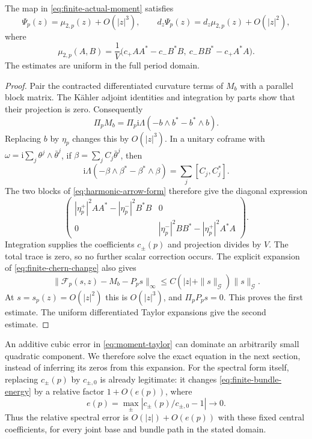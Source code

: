\begin{proposition}\label{prop:quadratic-moment}
The map in \eqref{eq:finite-actual-moment} satisfies
\begin{equation}\label{eq:moment-taylor}
 \Psi_p(z)=\mu_{2,p}(z)+O(|z|^3),\qquad
 d_z\Psi_p(z)=d_z\mu_{2,p}(z)+O(|z|^2),
\end{equation}
where
\begin{equation}\label{eq:quadratic-moment}
 \mu_{2,p}(A,B)=\frac1V
 \bigl(c_+AA^*-c_-B^*B,\ c_-BB^*-c_+A^*A\bigr).
\end{equation}
The estimates are uniform in the full period domain.
\end{proposition}

\begin{proof}
Pair the contracted differentiated curvature terms of
$M_b$ with a parallel block matrix. The Kähler adjoint
identities and integration by parts show that their
projection is zero. Consequently
\[
 \Pi_p M_b=\Pi_p\mathrm i\Lambda(-b\wedge b^*-b^*\wedge b).
\]
Replacing $b$ by $\eta_p$ changes this by $O(|z|^3)$.
In a unitary coframe with
$\omega=\mathrm i\sum_j\theta^j\wedge\bar\theta^j$,
if $\beta=\sum_jC_j\bar\theta^j$, then
\[
 \mathrm i\Lambda(-\beta\wedge\beta^*-\beta^*\wedge\beta)
                                      =\sum_j[C_j,C_j^*].
\]
The two blocks of \eqref{eq:harmonic-arrow-form} therefore
give the diagonal expression
\[
 \begin{pmatrix}
 |\eta_p^+|^2AA^*-|\eta_p^-|^2B^*B&0\\
 0&|\eta_p^-|^2BB^*-|\eta_p^+|^2A^*A
 \end{pmatrix}.
\]
Integration supplies the coefficients $c_\pm(p)$ and
projection divides by $V$. The total trace is zero,
so no further scalar correction occurs.
The explicit expansion of
\eqref{eq:finite-chern-change} also gives
\[
 \|\mathcal F_p(s,z)-M_b-P_ps\|_\infty
       \le C(|z|+\|s\|_{\mathcal G})\|s\|_{\mathcal G}.
\]
At $s=s_p(z)=O(|z|^2)$ this is $O(|z|^3)$, and
$\Pi_pP_ps=0$. This proves the first estimate.
The uniform differentiated Taylor expansions give the
second estimate.
\end{proof}

An additive cubic error in \eqref{eq:moment-taylor}
can dominate an arbitrarily small quadratic component.
We therefore solve the exact equation in the next
section, instead of inferring its zeros from this
expansion. For the spectral form itself, replacing
$c_\pm(p)$ by $c_{\pm,0}$ is already legitimate:
it changes \eqref{eq:finite-bundle-energy} by a relative
factor $1+O(e(p))$, where
\[
 e(p)=\max_\pm|c_\pm(p)/c_{\pm,0}-1|\longrightarrow0.
\]
Thus the relative spectral error is $O(|z|)+O(e(p))$
with these fixed central coefficients, for every joint
base and bundle path in the stated domain.
